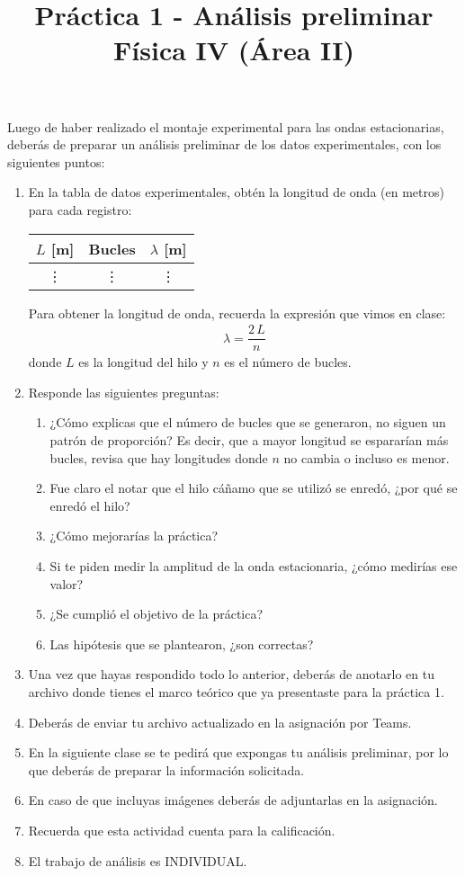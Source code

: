 \documentclass[14pt]{extarticle}
\title{\vspace*{-2cm} Práctica 1 - Análisis preliminar \\  Física IV (Área II) \vspace{-5ex}}
\date{}
\begin{document}
\maketitle

Luego de haber realizado el montaje experimental para las ondas estacionarias, deberás de preparar un análisis preliminar de los datos experimentales, con los siguientes puntos:

\begin{enumerate}
\item En la tabla de datos experimentales, obtén la longitud de onda (en metros) para cada registro:
\begin{table}[H]
\centering
\begin{tabular}{c | c | c}
$L$ [\unit{\meter}] & Bucles & $\lambda$ [\unit{\meter}] \\ \hline
\vdots & \vdots & \vdots \\ \hline
\end{tabular}
\end{table}
Para obtener la longitud de onda, recuerda la expresión que vimos en clase:
\begin{align*}
\lambda = \dfrac{2 \, L}{n}
\end{align*}
donde $L$ es la longitud del hilo y $n$ es el número de bucles.
\item Responde las siguientes preguntas:
\begin{enumerate}
\item ¿Cómo explicas que el número de bucles que se generaron, no siguen un patrón de proporción? Es decir, que a mayor longitud se espararían más bucles, revisa que hay longitudes donde $n$ no cambia o incluso es menor.
\item Fue claro el notar que el hilo cáñamo que se utilizó se enredó, ¿por qué se enredó el hilo?
\item ¿Cómo mejorarías la práctica?
\item Si te piden medir la amplitud de la onda estacionaria, ¿cómo medirías ese valor?
\item ¿Se cumplió el objetivo de la práctica?
\item Las hipótesis que se plantearon, ¿son correctas?
\end{enumerate}
\item Una vez que hayas respondido todo lo anterior, deberás de anotarlo en tu archivo donde tienes el marco teórico que ya presentaste para la práctica 1.
\item Deberás de enviar tu archivo actualizado en la asignación por Teams.
\item En la siguiente clase se te pedirá que expongas tu análisis preliminar, por lo que deberás de preparar la información solicitada.
\item En caso de que incluyas imágenes deberás de adjuntarlas en la asignación.
\item Recuerda que esta actividad cuenta para la calificación.
\item El trabajo de análisis es INDIVIDUAL.
\end{enumerate}
\end{document}
